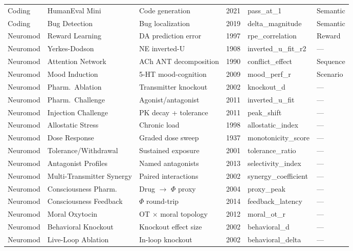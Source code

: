 \documentclass[10pt,landscape]{article}
\begin{document}
\begin{longtable}{@{}p{2.3cm}p{3.0cm}p{4.5cm}p{0.6cm}p{3.8cm}p{1.8cm}@{}}
\midrule
Coding & HumanEval Mini & Code generation & 2021 & pass\_at\_1 & Semantic \\
Coding & Bug Detection & Bug localization & 2019 & delta\_magnitude & Semantic \\

\midrule
Neuromod & Reward Learning & DA prediction error \citep{schultz1997dopamine} & 1997 & rpe\_correlation & Reward \\
Neuromod & Yerkes-Dodson & NE inverted-U \citep{yerkes1908relation} & 1908 & inverted\_u\_fit\_r2 & --- \\
Neuromod & Attention Network & ACh ANT decomposition & 1990 & conflict\_effect & Sequence \\
Neuromod & Mood Induction & 5-HT mood-cognition & 2009 & mood\_perf\_r & Scenario \\
Neuromod & Pharm.\ Ablation & Transmitter knockout & 2002 & knockout\_d & --- \\
Neuromod & Pharm.\ Challenge & Agonist/antagonist & 2011 & inverted\_u\_fit & --- \\
Neuromod & Injection Challenge & PK decay + tolerance & 2011 & peak\_shift & --- \\
Neuromod & Allostatic Stress & Chronic load & 1998 & allostatic\_index & --- \\
Neuromod & Dose Response & Graded dose sweep & 1937 & monotonicity\_score & --- \\
Neuromod & Tolerance/Withdrawal & Sustained exposure & 2001 & tolerance\_ratio & --- \\
Neuromod & Antagonist Profiles & Named antagonists & 2013 & selectivity\_index & --- \\
Neuromod & Multi-Transmitter Synergy & Paired interactions & 2002 & synergy\_coefficient & --- \\
Neuromod & Consciousness Pharm. & Drug $\to$ $\Phi$ proxy & 2004 & proxy\_peak & --- \\
Neuromod & Consciousness Feedback & $\Phi$ round-trip & 2014 & feedback\_latency & --- \\
Neuromod & Moral Oxytocin & OT $\times$ moral topology & 2012 & moral\_ot\_r & --- \\
Neuromod & Behavioral Knockout & Knockout effect size & 2002 & behavioral\_d & --- \\
Neuromod & Live-Loop Ablation & In-loop knockout & 2002 & behavioral\_delta & --- \\

\end{longtable}
\end{document}
